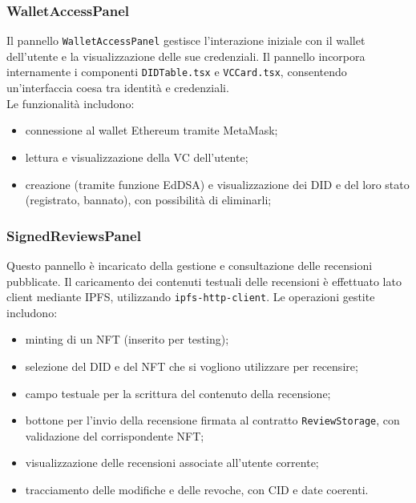             \subsubsection{WalletAccessPanel}
                \noindent Il pannello \texttt{WalletAccessPanel} gestisce l'interazione iniziale con il wallet dell'utente e la visualizzazione delle sue credenziali. Il pannello incorpora internamente i componenti \texttt{DIDTable.tsx} e \texttt{VCCard.tsx}, consentendo un'interfaccia coesa tra identità e credenziali. \\
                Le funzionalità includono:
                    \begin{itemize}
                        \item connessione al wallet Ethereum tramite MetaMask;
                        
                        \item lettura e visualizzazione della VC dell'utente;
                        
                        \item creazione (tramite funzione EdDSA) e visualizzazione dei DID e del loro stato (registrato, bannato), con possibilità di eliminarli;                        
                    \end{itemize}
                
            \subsubsection{SignedReviewsPanel}
                \noindent Questo pannello è incaricato della gestione e consultazione delle recensioni pubblicate. Il caricamento dei contenuti testuali delle recensioni è effettuato lato client mediante IPFS, utilizzando \texttt{ipfs-http-client}. Le operazioni gestite includono:
                    \begin{itemize}
                        \item minting di un NFT (inserito per testing);

                        \item selezione del DID e del NFT che si vogliono utilizzare per recensire;
                        
                        \item campo testuale per la scrittura del contenuto della recensione;
                        
                        \item bottone per l'invio della recensione firmata al contratto \texttt{ReviewStorage}, con validazione del corrispondente NFT;
                        
                        \item visualizzazione delle recensioni associate all'utente corrente;
                        
                        \item tracciamento delle modifiche e delle revoche, con CID e date coerenti.
                    \end{itemize}
                
